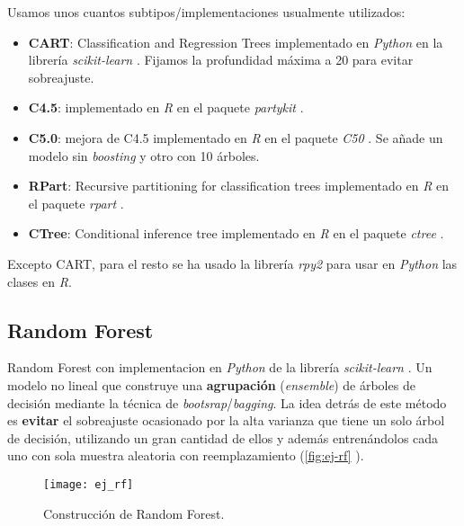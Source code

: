 Usamos unos cuantos subtipos/implementaciones usualmente utilizados:

\begin{itemize}
  \item \textbf{CART}: Classification and Regression Trees \cite{breiman1984classification} implementado en \emph{Python} en la librería \emph{scikit-learn} \cite{scikit2020dt}. Fijamos la profundidad máxima a 20 para evitar sobreajuste.
  \item \textbf{C4.5}: \cite{quinlan2014c4} implementado en \emph{R} en el paquete \emph{partykit} \cite{hornik2020c45}.
  \item \textbf{C5.0}: mejora de C4.5 \cite{quinlan2019c50} implementado en \emph{R} en el paquete \emph{C50} \cite{kuhn2020c50}. Se añade un modelo sin \emph{boosting} y otro con 10 árboles.
  \item \textbf{RPart}: Recursive partitioning for classification trees \cite{breiman1984classification} implementado en \emph{R} en el paquete \emph{rpart} \cite{atkinson2019rpart}.
  \item \textbf{CTree}: Conditional inference tree \cite{hothorn2006unbiased, hothorn2015ctree} implementado en \emph{R} en el paquete \emph{ctree} \cite{hothorn2020ctree}.
\end{itemize}

Excepto CART, para el resto se ha usado la librería \emph{rpy2} \cite{gautier2020rpy2} para usar en \emph{Python} las clases en \emph{R}.

\subsection{Random Forest}

Random Forest \cite{ho1995random, breiman2001random} con implementacion en \emph{Python} de la librería \emph{scikit-learn} \cite{scikit2020rf}. Un modelo no lineal que construye una \textbf{agrupación} (\emph{ensemble}) de árboles de decisión mediante la técnica de \emph{bootsrap}/\emph{bagging}. La idea detrás de este método es \textbf{evitar} el sobreajuste ocasionado por la alta varianza que tiene un solo árbol de decisión, utilizando un gran cantidad de ellos y además entrenándolos cada uno con sola muestra aleatoria con reemplazamiento (\autoref{fig:ej-rf} \cite{orellana2018rf}).

\begin{figure}[htbp]
  \centering
  \texttt{[image: ej\_rf]}
  \caption{Construcción de Random Forest.}
  \label{fig:ej-rf}
\end{figure}

